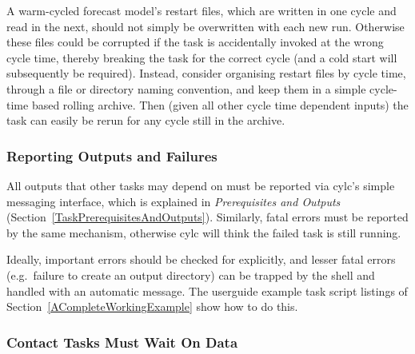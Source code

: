 \documentclass[11pt,a4paper]{article}
\begin{document}
A warm-cycled forecast model's restart files, which are written in
one cycle and read in the next, should not simply be overwritten with
each new run. Otherwise these files could be corrupted if the task is
accidentally invoked at the wrong cycle time, thereby breaking the task
for the correct cycle (and a cold start will subsequently be required).
Instead, consider organising restart files by cycle time, through a file
or directory naming convention, and keep them in a simple cycle-time
based rolling archive. Then (given all other cycle time dependent
inputs) the task can easily be rerun for any cycle still in the archive.

\subsubsection{Reporting Outputs and Failures}

All outputs that other tasks may depend on must be reported via cylc's
simple messaging interface, which is explained in {\em Prerequisites and
Outputs} (Section~\ref{TaskPrerequisitesAndOutputs}). Similarly, fatal
errors must be reported by the same mechanism, otherwise cylc will think
the failed task is still running. 

Ideally, important errors should be checked for explicitly, and lesser
fatal errors (e.g.\ failure to create an output directory) can be
trapped by the shell and handled with an automatic message. The
userguide example task script listings of
Section~\ref{ACompleteWorkingExample} show how to do this.

\subsubsection{Contact Tasks Must Wait On Data}
\end{document}
